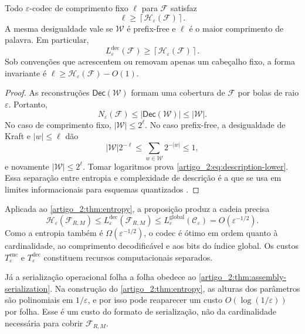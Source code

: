 \begin{proposition}\label{map:artigo_2:3.20}
\label{artigo_2:prop:description-lower}
Todo $\varepsilon$-codec de comprimento fixo $\ell$ para $\mathcal F$ satisfaz
\begin{equation}
 \ell\ge\left\lceil\mathcal H_\varepsilon(\mathcal F)\right\rceil.
 \label{artigo_2:eq:description-lower}
\end{equation}
A mesma desigualdade vale se $\mathcal W$ é prefix-free e $\ell$ é o maior
comprimento de palavra. Em particular,
\[
 L_\varepsilon^{\mathrm{dec}}(\mathcal F)
 \ge\left\lceil\mathcal H_\varepsilon(\mathcal F)\right\rceil.
\]
Sob convenções que acrescentem ou removam apenas um cabeçalho fixo, a forma
invariante é $\ell\ge\mathcal H_\varepsilon(\mathcal F)-O(1)$.
\end{proposition}

\begin{proof}
As reconstruções $\mathsf{Dec}(\mathcal W)$ formam uma cobertura de
$\mathcal F$ por bolas de raio $\varepsilon$. Portanto,
\[
 N_\varepsilon(\mathcal F)
 \le |\mathsf{Dec}(\mathcal W)|\le|\mathcal W|.
\]
No caso de comprimento fixo, $|\mathcal W|\le2^\ell$. No caso prefix-free, a
desigualdade de Kraft e $|w|\le\ell$ dão
\[
 |\mathcal W|2^{-\ell}
 \le\sum_{w\in\mathcal W}2^{-|w|}\le1,
\]
e novamente $|\mathcal W|\le2^\ell$. Tomar logaritmos prova
\eqref{artigo_2:eq:description-lower}. Essa separação entre entropia e complexidade de
descrição é a que se usa em limites informacionais para esquemas quantizados
\citep{artigo_1-bolcskei2019}.
\end{proof}

Aplicada ao \cref{artigo_2:thm:entropy}, a proposição produz a cadeia precisa
\begin{equation}
 \mathcal H_\varepsilon(\mathcal F_{R,M})
 \le L_\varepsilon^{\mathrm{dec}}(\mathcal F_{R,M})
 \le L_\varepsilon^{\mathrm{global}}(\mathcal C_\varepsilon)
 =O(\varepsilon^{-1/2}).
 \label{artigo_2:eq:complexity-chain}
\end{equation}
Como a entropia também é $\Omega(\varepsilon^{-1/2})$, o codec é ótimo em
ordem quanto à cardinalidade, ao comprimento decodificável e aos bits do
índice global. Os custos $T_\varepsilon^{\mathrm{enc}}$ e
$T_\varepsilon^{\mathrm{dec}}$ constituem recursos computacionais separados.

Já a serialização operacional folha a folha obedece ao
\cref{artigo_2:thm:assembly-serialization}. Na construção do \cref{artigo_2:thm:entropy}, as
alturas dos parâmetros são polinomiais em $1/\varepsilon$, e por isso pode
reaparecer um custo $O(\log(1/\varepsilon))$ por folha. Esse é um custo do
formato de serialização, não da cardinalidade necessária para cobrir
$\mathcal F_{R,M}$.

